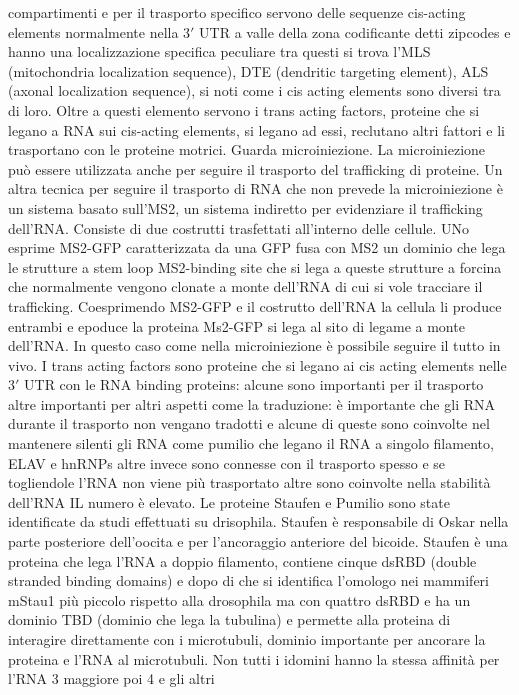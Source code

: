 compartimenti e per il trasporto specifico servono delle sequenze cis-acting elements normalmente nella $3'$ UTR a valle della zona codificante detti zipcodes e hanno una localizzazione
specifica peculiare tra questi si trova l'MLS (mitochondria localization sequence), DTE (dendritic targeting element), ALS (axonal localization sequence), si noti come i cis acting 
elements sono diversi tra di loro. Oltre a questi elemento servono i trans acting factors, proteine che si legano a RNA sui cis-acting elements, si legano ad essi, reclutano altri 
fattori e li trasportano con le proteine motrici. Guarda microiniezione. La microiniezione pu\`o essere utilizzata anche per seguire il trasporto del trafficking di proteine.
Un altra tecnica per seguire il trasporto di RNA che non prevede la microiniezione \`e un sistema basato sull'MS2, un sistema indiretto per evidenziare il trafficking dell'RNA. Consiste
di due costrutti trasfettati all'interno delle cellule. UNo esprime MS2-GFP caratterizzata da una GFP fusa con MS2 un dominio che lega le strutture a stem loop MS2-binding site che si 
lega a queste strutture a forcina che normalmente vengono clonate a monte dell'RNA di cui si vole tracciare il trafficking. Coesprimendo MS2-GFP e il costrutto dell'RNA la cellula li 
produce entrambi e epoduce la proteina Ms2-GFP si lega al sito di legame a monte dell'RNA. In questo caso come nella microiniezione \`e possibile seguire il tutto in vivo. I trans 
acting factors sono proteine che si legano ai cis acting elements nelle $3'$ UTR con le RNA binding proteins: alcune sono importanti per il trasporto altre importanti per altri aspetti
come la traduzione: \`e importante che gli RNA durante il trasporto non vengano tradotti e alcune di queste sono coinvolte nel mantenere silenti gli RNA come pumilio che legano il RNA
a singolo filamento, ELAV e hnRNPs altre invece sono connesse con il trasporto spesso e se togliendole l'RNA non viene pi\`u trasportato altre sono coinvolte nella stabilit\`a dell'RNA
IL numero \`e elevato. Le proteine Staufen e Pumilio sono state identificate da studi effettuati su drisophila. Staufen \`e responsabile di Oskar nella parte posteriore dell'oocita
e per l'ancoraggio anteriore del bicoide. Staufen \`e una proteina che lega l'RNA a doppio filamento, contiene cinque dsRBD (double stranded binding domains) e dopo di che si identifica
l'omologo nei mammiferi mStau1 pi\`u piccolo rispetto alla drosophila ma con quattro dsRBD e ha un dominio TBD (dominio che lega la tubulina) e permette alla proteina di interagire 
direttamente con i microtubuli, dominio importante per ancorare la proteina e l'RNA al microtubuli. Non  tutti i idomini hanno la stessa affinit\`a per l'RNA 3 maggiore poi 4 e gli altri
